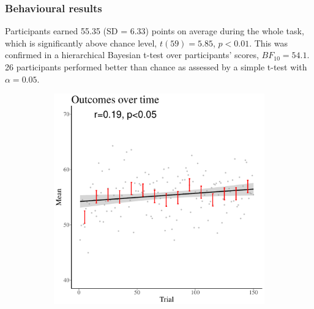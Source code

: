 \documentclass[a4paper,natbib]{apa6}
\begin{document}
\subsubsection{Behavioural results}

Participants earned 55.35 (SD = 6.33) points on average during the whole task, which is significantly above chance level, $t(59)=5.85$, $p<0.01$. This was confirmed in a hierarchical Bayesian t-test over participants' scores, $BF_{10}=54.1$. 26 participants performed better than chance as assessed by a simple t-test with $\alpha=0.05$.

\begin{figure}[ht]
\centering
\begin{subfigure}{.33\textwidth}
  \centering
\includegraphics[width=.95\textwidth]{meanovertime3.pdf}
\caption{}
\end{subfigure}%
\begin{subfigure}{.33\textwidth}
  \centering

\end{subfigure}
\end{figure}
\end{document}
